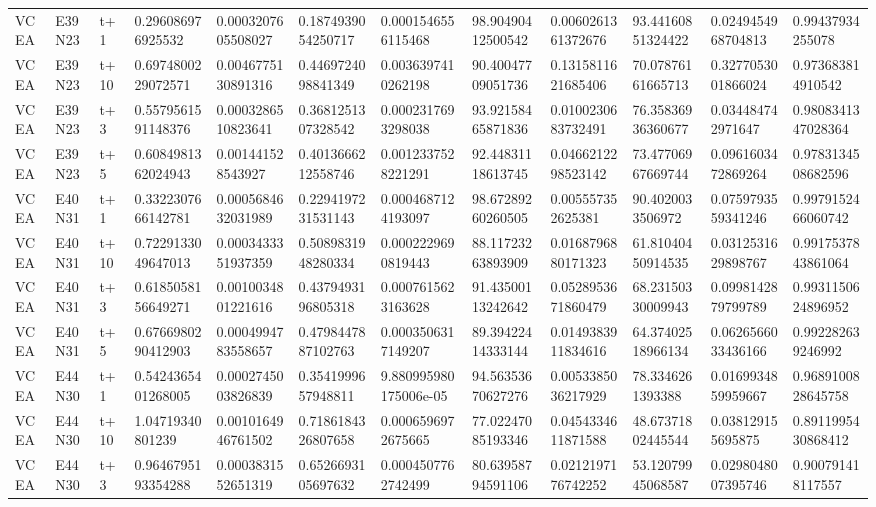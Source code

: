 \begin{landscape}
\begin{longtable}{llllllllllll}
VCEA & E39N23 & t+1 & 0.296086976925532 & 0.0003207605508027 & 0.1874939054250717 & 0.0001546556115468 & 98.90490412500542 & 0.0060261361372676 & 93.44160851324422 & 0.0249454968704813 & 0.99437934255078 \\
VCEA & E39N23 & t+10 & 0.6974800229072571 & 0.0046775130891316 & 0.4469724098841349 & 0.0036397410262198 & 90.40047709051736 & 0.1315811621685406 & 70.07876161665713 & 0.3277053001866024 & 0.973683814910542 \\
VCEA & E39N23 & t+3 & 0.5579561591148376 & 0.0003286510823641 & 0.3681251307328542 & 0.0002317693298038 & 93.92158465871836 & 0.0100230683732491 & 76.35836936360677 & 0.034484742971647 & 0.9808341347028364 \\
VCEA & E39N23 & t+5 & 0.6084981362024943 & 0.001441528543927 & 0.4013666212558746 & 0.0012337528221291 & 92.44831118613745 & 0.0466212298523142 & 73.47706967669744 & 0.0961603472869264 & 0.9783134508682596 \\
VCEA & E40N31 & t+1 & 0.3322307666142781 & 0.0005684632031989 & 0.2294197231531143 & 0.0004687124193097 & 98.67289260260505 & 0.005557352625381 & 90.4020033506972 & 0.0759793559341246 & 0.9979152466060742 \\
VCEA & E40N31 & t+10 & 0.7229133049647013 & 0.0003433351937359 & 0.5089831948280334 & 0.0002229690819443 & 88.11723263893909 & 0.0168796880171323 & 61.81040450914535 & 0.0312531629898767 & 0.9917537843861064 \\
VCEA & E40N31 & t+3 & 0.6185058156649271 & 0.0010034801221616 & 0.4379493196805318 & 0.0007615623163628 & 91.43500113242642 & 0.0528953671860479 & 68.23150330009943 & 0.0998142879799789 & 0.9931150624896952 \\
VCEA & E40N31 & t+5 & 0.6766980290412903 & 0.0004994783558657 & 0.4798447887102763 & 0.0003506317149207 & 89.39422414333144 & 0.0149383911834616 & 64.37402518966134 & 0.0626566033436166 & 0.992282639246992 \\
VCEA & E44N30 & t+1 & 0.5424365401268005 & 0.0002745003826839 & 0.3541999657948811 & 9.880995980175006e-05 & 94.56353670627276 & 0.0053385036217929 & 78.3346261393388 & 0.0169934859959667 & 0.9689100828645758 \\
VCEA & E44N30 & t+10 & 1.04719340801239 & 0.0010164946761502 & 0.7186184326807658 & 0.0006596972675665 & 77.02247085193346 & 0.0454334611871588 & 48.67371802445544 & 0.038129155695875 & 0.8911995430868412 \\
VCEA & E44N30 & t+3 & 0.9646795193354288 & 0.0003831552651319 & 0.6526693105697632 & 0.0004507762742499 & 80.63958794591106 & 0.0212197176742252 & 53.12079945068587 & 0.0298048007395746 & 0.900791418117557 \\

\end{longtable}
\end{landscape}
